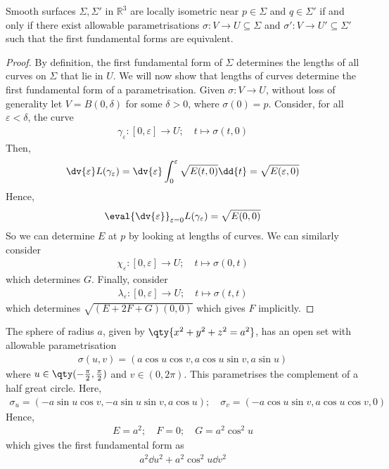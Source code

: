 \begin{lemma}
	Smooth surfaces $\Sigma, \Sigma'$ in $\mathbb R^3$ are locally isometric near $p \in \Sigma$ and $q \in \Sigma'$ if and only if there exist allowable parametrisations $\sigma \colon V \to U \subseteq \Sigma$ and $\sigma' \colon V \to U' \subseteq \Sigma'$ such that the first fundamental forms are equivalent.
\end{lemma}
\begin{proof}
	By definition, the first fundamental form of $\Sigma$ determines the lengths of all curves on $\Sigma$ that lie in $U$.
	We will now show that lengths of curves determine the first fundamental form of a parametrisation.
	Given $\sigma \colon V \to U$, without loss of generality let $V = B(0,\delta)$ for some $\delta > 0$, where $\sigma(0) = p$.
	Consider, for all $\varepsilon < \delta$, the curve
	\begin{align*}
		\gamma_\varepsilon \colon [0,\varepsilon] \to U;\quad t \mapsto \sigma(t,0)
	\end{align*}
	Then,
	\begin{align*}
		\dv{\varepsilon} L(\gamma_\varepsilon) = \dv{\varepsilon} \int_0^\varepsilon \sqrt{E(t,0)} \dd{t} = \sqrt{E(\varepsilon,0)}
	\end{align*}
	Hence,
	\begin{align*}
		\eval{\dv{\varepsilon}}_{\varepsilon = 0} L(\gamma_\varepsilon) = \sqrt{E(0,0)}
	\end{align*}
	So we can determine $E$ at $p$ by looking at lengths of curves.
	We can similarly consider
	\begin{align*}
		\chi_\varepsilon \colon [0,\varepsilon] \to U;\quad t \mapsto \sigma(0,t)
	\end{align*}
	which determines $G$.
	Finally, consider
	\begin{align*}
		\lambda_\varepsilon \colon [0,\varepsilon] \to U;\quad t \mapsto \sigma(t,t)
	\end{align*}
	which determines $\sqrt{(E+2F+G)(0,0)}$ which gives $F$ implicitly.
\end{proof}
\begin{example}
	The sphere of radius $a$, given by $\qty{x^2 + y^2 + z^2 = a^2}$, has an open set with allowable parametrisation
	\begin{align*}
		\sigma(u,v) = (a\cos u \cos v, a \cos u \sin v, a \sin u)
	\end{align*}
	where $u \in \qty(-\frac{\pi}{2}, \frac{\pi}{2})$ and $v \in (0,2\pi)$.
	This parametrises the complement of a half great circle.
	Here,
	\begin{align*}
		\sigma_u = (-a \sin u \cos v, -a \sin u \sin v, a \cos u);\quad \sigma_v = (-a \cos u \sin v, a \cos u \cos v, 0)
	\end{align*}
	Hence,
	\begin{align*}
		E = a^2; \quad F = 0;\quad G = a^2 \cos^2 u
	\end{align*}
	which gives the first fundamental form as
	\begin{align*}
		a^2 \dd{u}^2 + a^2 \cos^2 u \dd{v}^2
	\end{align*}
\end{example}
